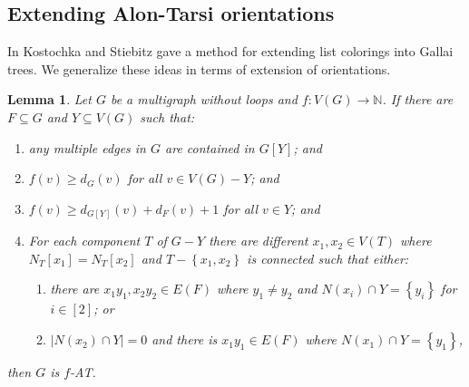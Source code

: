 \documentclass[12pt]{article}
\theoremstyle{plain}
\newtheorem{lem}[thm]{Lemma}
\theoremstyle{definition}
\theoremstyle{remark}
\newcommand{\IN}{\mathbb{N}}
\newcommand{\set}[1]{\left\{ #1 \right\}}
\newcommand{\card}[1]{\left|#1\right|}
\newcommand{\func}[3]{#1\colon #2 \rightarrow #3}
\newcommand{\irange}[1]{\left[#1\right]}
\begin{document}
\subsection{Extending Alon-Tarsi orientations}
In \cite{kostochkastiebitzedgesincriticalgraph} Kostochka and Stiebitz gave a method for extending list colorings into Gallai trees. We generalize these ideas in terms of extension of orientations.

\begin{lem}\label{ConfigurationTypeTwoEuler}
Let $G$ be a multigraph without loops and $\func{f}{V(G)}{\IN}$. If there are $F \subseteq G$ and
$Y \subseteq V(G)$ such that:
\begin{enumerate}
\item any multiple edges in $G$ are contained in $G[Y]$; and
\item $f(v) \geq d_G(v)$ for all $v \in V(G) - Y$; and
\item $f(v) \geq d_{G[Y]}(v) + d_F(v) + 1$ for all $v \in Y$; and
\item For each component $T$ of $G-Y$ there are different $x_1, x_2 \in V(T)$ where $N_T[x_1] = N_T[x_2]$ and $T - \set{x_1, x_2}$ is connected such that either:
	\begin{enumerate}
	\item there are $x_1y_1, x_2y_2 \in E(F)$ where $y_1 \neq y_2$ and $N(x_i) \cap Y = \set{y_i}$ for $i \in \irange{2}$; or
	\item $\card{N(x_2) \cap Y} = 0$ and there is $x_1y_1 \in E(F)$ where $N(x_1) \cap Y = \set{y_1}$,
	\end{enumerate}
\end{enumerate}

\noindent then $G$ is $f$-AT.
\end{lem}
\end{document}

